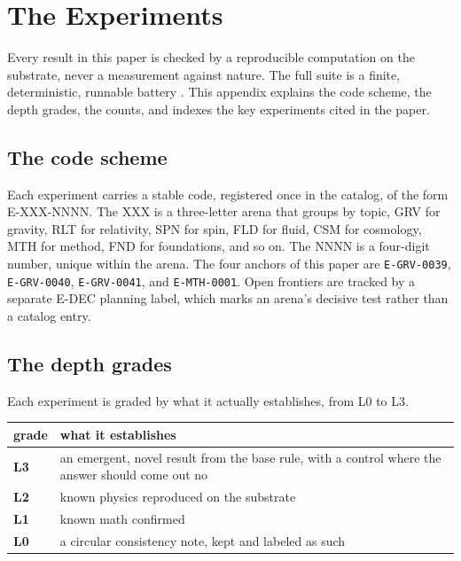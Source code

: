 \section{The Experiments}

Every result in this paper is checked by a reproducible computation on the substrate, never a measurement against nature.
The full suite is a finite, deterministic, runnable battery \cite{cluesurf2026repo}. This appendix explains the code
scheme, the depth grades, the counts, and indexes the key experiments cited in the paper.

\subsection*{The code scheme}

Each experiment carries a stable code, registered once in the catalog, of the form E-XXX-NNNN. The XXX is a three-letter
arena that groups by topic, GRV for gravity, RLT for relativity, SPN for spin, FLD for fluid, CSM for cosmology, MTH for
method, FND for foundations, and so on. The NNNN is a four-digit number, unique within the arena. The four anchors of this
paper are \texttt{E-GRV-0039}, \texttt{E-GRV-0040}, \texttt{E-GRV-0041}, and \texttt{E-MTH-0001}. Open frontiers are tracked by a separate E-DEC planning
label, which marks an arena's decisive test rather than a catalog entry.

\subsection*{The depth grades}

Each experiment is graded by what it actually establishes, from L0 to L3.

\begin{table}[ht]
\centering
\begin{tabularx}{\textwidth}{@{}l >{\raggedright\arraybackslash}X@{}}
\toprule
grade & what it establishes \\
\midrule
\textbf{L3} & an emergent, novel result from the base rule, with a control where the answer should come out no \\
\textbf{L2} & known physics reproduced on the substrate \\
\textbf{L1} & known math confirmed \\
\textbf{L0} & a circular consistency note, kept and labeled as such \\
\bottomrule
\end{tabularx}
\end{table}

